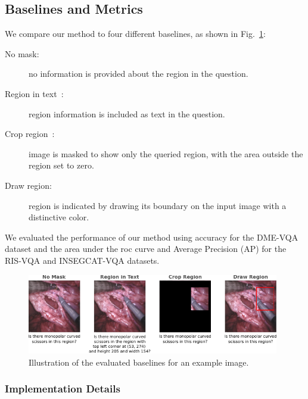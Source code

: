\subsection{Baselines and Metrics}
We compare our method to four different baselines, as shown in Fig.~\ref{fig:baselines}:
\begin{description}
    \item[No mask:] no information is provided about the region in the question.
    \item[Region in text~\cite{vu2020question}:] region information is included as text in the question.
    \item[Crop region~\cite{tascon2022consistency}:] image is masked to show only the queried region, with the area outside the region set to zero.
    \item[Draw region:] region is indicated by drawing its boundary on the input image with a distinctive color.
\end{description}
We evaluated the performance of our method using accuracy for the DME-VQA dataset and the area under the \gls{roc} curve and Average Precision (AP) for the RIS-VQA and INSEGCAT-VQA datasets.

\begin{figure}[!t]
\begin{center}
\includegraphics[width=0.98\textwidth]{Figures/Part1_LocVQA/01_locatt/baselines.pdf}
\caption{Illustration of the evaluated baselines for an example image.}
\label{fig:baselines}
\end{center}
\end{figure}

\subsubsection{Implementation Details}

